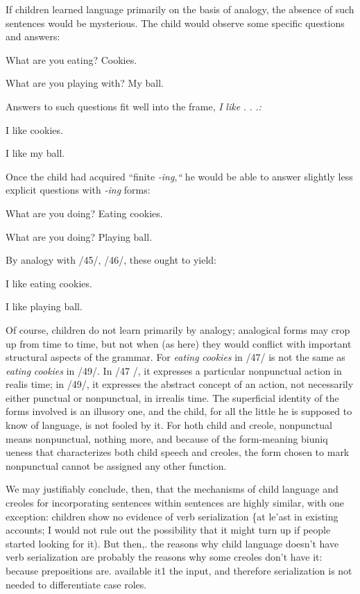 If children learned language primarily on the basis of analogy, the absence of such sentences would be mysterious. The child would observe some specific questions and answers:

\ea\label{ex:43}
What are you eating? Cookies.
\z

\ea\label{ex:44}
 What are you playing with? My ball.
\z

Answers to such questions fit well into the frame, \textit{I} \textit{like} \textit{.} . \textit{.}\textit{:}

\ea\label{ex:45}
 I like cookies.
\z

\ea\label{ex:46}
I like my ball.
\z

Once the child had acquired ``finite \textit{-ing},\textit{``} he would be able to answer slightly less explicit questions with \textit{-ing} forms:

\ea\label{ex:47}
 What are you doing? Eating cookies.
\glt
\z

\ea\label{ex:48}
 What are you doing? Playing ball.
\glt
\z

By analogy with /45/, /46/, these ought to yield:

\ea\label{ex:49}
 I like eating cookies. 
\z

\ea\label{ex:50}
 I like playing ball. 
\z

Of course, children do not  learn primarily by analogy; analogical
forms may crop up from time to time, but not when (as here) they would conflict with important structural aspects of the grammar. For \textit{eating} \textit{cookies} in /47/ is not the same as \textit{eating} \textit{cookies} in /49/. In /47 /, it expresses a particular nonpunctual action in realis time; in /49/, it expresses the abstract concept of an action, not necessarily either punctual or nonpunctual, in irrealis time. The superficial identity of the forms involved is an illusory one, and the child, for all the little he is supposed to know of language, is not fooled by it. For hoth child and creole, nonpunctual means nonpunctual, nothing more, and be\-cause of the form-meaning biuniq ueness that characterizes both child speech and creoles, the form chosen to mark nonpunctual cannot be assigned any other function.

We may justifiably conclude, then, that the mechanisms of child
language and creoles for incorporating sentences within sentences are highly similar, with one exception: children show no evidence of verb serialization \{at le'ast in existing accounts; I would not rule out the possibility that it might turn up if people started looking for it). But then,. the reasons why child language doesn't have verb serialization are probably the reasons why some creoles don't have it: because prepositions are. available it1 the input, and therefore serialization is not needed to differentiate case roles.

